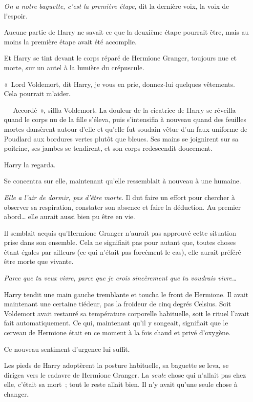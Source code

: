 \emph{On a notre baguette, c'est la première étape}, dit la dernière voix, la voix de l'espoir.

Aucune partie de Harry ne savait ce que la deuxième étape pourrait être, mais au moins la première étape avait été accomplie.

Et Harry se tint devant le corps réparé de Hermione Granger, toujours nue et morte, sur un autel à la lumière du crépuscule.

«~Lord Voldemort, dit Harry, je vous en prie, donnez-lui quelques vêtements. Cela pourrait m'aider.

--- Accordé~», siffla Voldemort. La douleur de la cicatrice de Harry se réveilla quand le corps nu de la fille s'éleva, puis s'intensifia à nouveau quand des feuilles mortes dansèrent autour d'elle et qu'elle fut soudain vêtue d'un faux uniforme de Poudlard aux bordures vertes plutôt que bleues. Ses mains se joignirent sur sa poitrine, ses jambes se tendirent, et son corps redescendit doucement.

Harry la regarda.

Se concentra sur elle, maintenant qu'elle ressemblait à nouveau à une humaine.

\emph{Elle a l'air de dormir, pas d'être morte.} Il dut faire un effort pour chercher à observer sa respiration, constater son absence et faire la déduction. Au premier abord… elle aurait aussi bien pu être en vie.

Il semblait acquis qu'Hermione Granger n'aurait pas approuvé cette situation prise dans son ensemble. Cela ne signifiait pas pour autant que, toutes choses étant égales par ailleurs (ce qui n'était pas forcément le cas), elle aurait préféré être morte que vivante.

\emph{Parce que tu veux vivre, parce que je crois sincèrement que tu voudrais vivre…}

Harry tendit une main gauche tremblante et toucha le front de Hermione. Il avait maintenant une certaine tiédeur, pas la froideur de cinq degrés Celsius. Soit Voldemort avait restauré sa température corporelle habituelle, soit le rituel l'avait fait automatiquement. Ce qui, maintenant qu'il y songeait, signifiait que le cerveau de Hermione était en ce moment à la fois chaud et privé d'oxygène.

Ce nouveau sentiment d'urgence lui suffit.

Les pieds de Harry adoptèrent la posture habituelle, sa baguette se leva, se dirigea vers le cadavre de Hermione Granger. La \emph{seule} chose qui n'allait pas chez elle, c'était sa mort~; tout le reste allait bien. Il n'y avait qu'une seule chose à changer.

